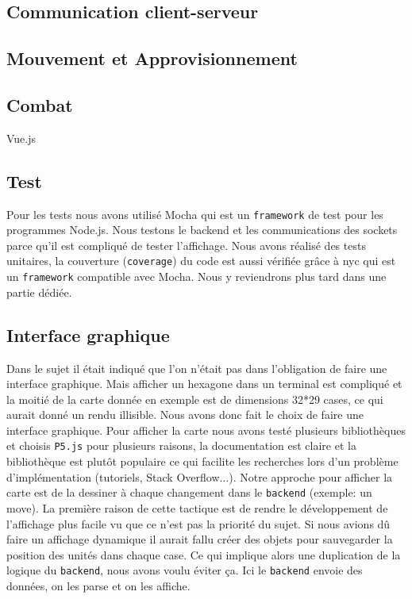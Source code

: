\subsection{Communication client-serveur}



\subsection{Mouvement et Approvisionnement}

\subsection{Combat}



Vue.js

\subsection{Test}

Pour les tests nous avons utilisé Mocha qui est un {\tt framework} de test pour les programmes Node.js.
Nous testons le backend et les communications des sockets parce qu'il est compliqué de tester l'affichage.
Nous avons réalisé des tests unitaires, la couverture ({\tt coverage}) du code est aussi vérifiée grâce à nyc qui est un {\tt framework} compatible avec Mocha.
Nous y reviendrons plus tard dans une partie dédiée.

\subsection{Interface graphique}

Dans le sujet il était indiqué que l'on n'était pas dans l'obligation de faire une interface graphique. Mais afficher un hexagone dans un terminal est compliqué et la moitié de la carte donnée en exemple est de dimensions 32*29 cases, ce qui aurait donné un rendu illisible. Nous avons donc fait le choix de faire une interface graphique. Pour afficher la carte nous avons testé plusieurs bibliothèques et choisis \lstinline{P5.js} pour plusieurs raisons, la documentation est claire et la bibliothèque est plutôt populaire ce qui facilite les recherches lors d'un problème d'implémentation (tutoriels, Stack Overflow...).
Notre approche pour afficher la carte est de la dessiner à chaque changement dans le \lstinline{backend} (exemple: un move). La première raison de cette tactique est de rendre le développement de l'affichage plus facile vu que ce n'est pas la priorité du sujet. Si nous avions dû faire un affichage dynamique il aurait fallu créer des objets pour sauvegarder la position des unités dans chaque case. Ce qui implique alors une duplication de la logique du \lstinline{backend}, nous avons voulu éviter ça. Ici le \lstinline{backend} envoie des données, on les parse et on les affiche.

